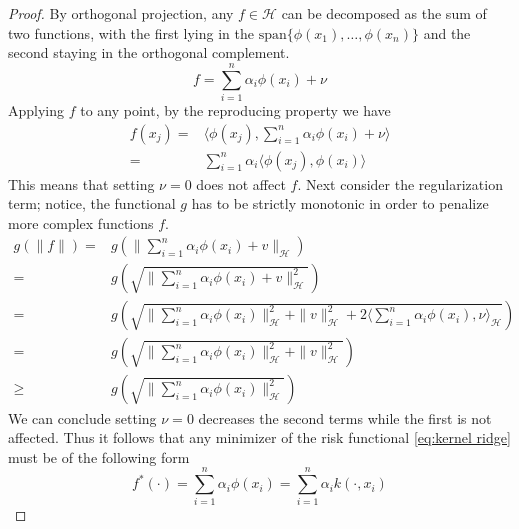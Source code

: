 \begin{proof}
    By orthogonal projection, any $f \in \mathcal{H}$ can be decomposed as the sum of two functions, with the first lying in the $\textrm{span}\{\phi(x_1),\dots, \phi(x_n)\}$ and the second staying in the orthogonal complement.
    \begin{equation}
        f=\sum\limits_{i=1}^{n}\alpha_i \phi(x_i)+\nu
    \end{equation}
    Applying $f$ to any point, by the reproducing property we have
    \begin{equation}
        \begin{aligned}
            f(x_j)=&\langle \phi(x_j), \sum\limits_{i=1}^{n}\alpha_i \phi(x_i)+\nu\rangle
            \\
            =&\sum\limits_{i=1}^{n}\alpha_i\langle \phi(x_j), \phi(x_i)\rangle
        \end{aligned}
    \end{equation}
    This means that setting $\nu=0$ does not affect $f$.
    Next consider the regularization term; notice, the functional $g$ has to be strictly monotonic in order to penalize more complex functions $f$.
    \begin{equation}
        \begin{aligned}
            g(\|f\|)=&g(\|\sum\limits_{i=1}^n \alpha_i \phi(x_i)+v\|_\mathcal{H})
            \\
            =&g\left(\sqrt{\|\sum\limits_{i=1}^n \alpha_i \phi(x_i)+v\|_\mathcal{H}^2}\right)
            \\
            =&g\left(\sqrt{\|\sum\limits_{i=1}^n \alpha_i \phi(x_i)\|_{\mathcal{H}}^2+\|v\|_\mathcal{H}^2+2\langle\sum\limits_{i=1}^n \alpha_i \phi(x_i),\nu \rangle_{\mathcal{H}}}\right)
            \\
            =&g\left(\sqrt{\|\sum\limits_{i=1}^n \alpha_i \phi(x_i)\|_{\mathcal{H}}^2+\|v\|_\mathcal{H}^2}\right)
            \\
            \geq &g\left(\sqrt{\|\sum\limits_{i=1}^n \alpha_i \phi(x_i)\|_{\mathcal{H}}^2}\right)
        \end{aligned}
    \end{equation}
    We can conclude setting $\nu=0$ decreases the second terms while the first is not affected. Thus it follows that any minimizer of the risk functional \ref{eq:kernel ridge} must be of the following form
    \begin{equation}
        f^*(\cdot)=\sum\limits_{i=1}^n \alpha_i \phi(x_i)=\sum\limits_{i=1}^n \alpha_i k(\cdot, x_i)
    \end{equation}
\end{proof}

